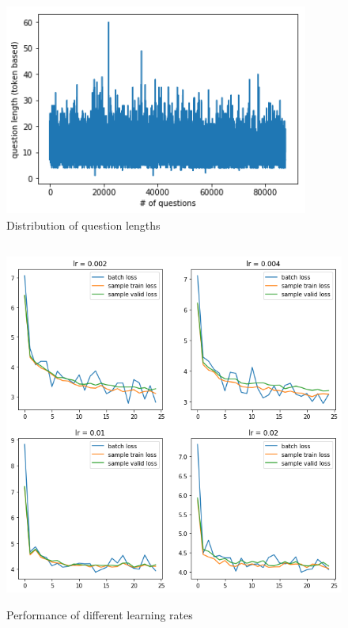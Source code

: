\documentclass[modernstyle,12pt]{sjsuthesis}
\theoremstyle{definition}
\begin{document}
\begin{figure}[htbp]\centering
  \includegraphics[width=10cm, height=7cm]{figures/question_length.png}
  \caption{Distribution of question lengths}
  \label{f:question_length}
\end{figure}

\begin{figure}[htbp]\centering
  \includegraphics[width=12cm, height=12cm]{figures/lr.png}
  \caption{Performance of different learning rates}
  \label{f:lr}
\end{figure}
\end{document}

